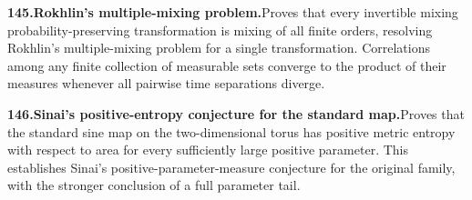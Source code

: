 \documentclass[11pt,a4paper]{article}
\begin{document}
  \par \begin{minipage}{\linewidth}
  \fontsize{10.5}{12.6}\selectfont\RaggedRight
  \hypertarget{result 145}{}
  {\bfseries\textcolor{muted}{145.}\enspace Rokhlin's multiple-mixing problem.}\enspace Proves that every invertible mixing probability-preserving transformation is mixing of all finite orders, resolving Rokhlin's multiple-mixing problem for a single transformation. Correlations among any finite collection of measurable sets converge to the product of their measures whenever all pairwise time separations diverge.\par
  \end{minipage}\par\vspace{5pt}



  \par \begin{minipage}{\linewidth}
  \fontsize{10.5}{12.6}\selectfont\RaggedRight
  \hypertarget{result 146}{}
  {\bfseries\textcolor{muted}{146.}\enspace Sinai's positive-entropy conjecture for the standard map.}\enspace Proves that the standard sine map on the two-dimensional torus has positive metric entropy with respect to area for every sufficiently large positive parameter. This establishes Sinai's positive-parameter-measure conjecture for the original family, with the stronger conclusion of a full parameter tail.\par
  \end{minipage}\par\vspace{5pt}
\end{document}
